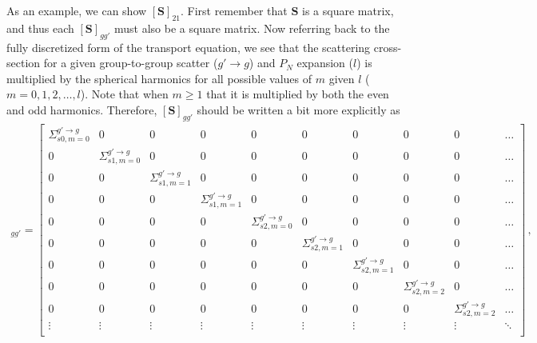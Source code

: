 \documentclass[10pt]{article}
\begin{document}
As an example, we can show $[\textbf{S}]_{21}$. First remember that $\textbf{S}$ is a square matrix, and thus each $[\textbf{S}]_{gg'}$ must also be a square matrix. Now referring back to the fully discretized form of the transport equation, we see that the scattering cross-section for a given group-to-group scatter ($g' \rightarrow g$) and $P_N$ expansion ($l$) is multiplied by the spherical harmonics for all possible values of $m$ given $l$ ($m=0,1,2,\dots,l$). Note that when $m \geq 1$ that it is multiplied by both the even and odd harmonics. Therefore, $[\textbf{S}]_{gg'}$ should be written a bit more explicitly as
%
\begin{align*}
[\textbf{S}]_{gg'} = 
\begin{bmatrix}
	\Sigma_{s0,m=0}^{g' \rightarrow g} & 0 & 0 & 0 & 0 & 0 & 0 & 0 & 0 & \dots \\
	0 & \Sigma_{s1,m=0}^{g' \rightarrow g} & 0 & 0 & 0 & 0 & 0 & 0 & 0 & \dots \\
	0 & 0 & \Sigma_{s1,m=1}^{g' \rightarrow g} & 0 & 0 & 0 & 0 & 0 & 0 & \dots \\
	0 & 0 & 0 & \Sigma_{s1,m=1}^{g' \rightarrow g} & 0 & 0 & 0 & 0 & 0 & \dots \\
	0 & 0 & 0 & 0 & \Sigma_{s2,m=0}^{g' \rightarrow g} & 0 & 0 & 0 & 0 & \dots \\
	0 & 0 & 0 & 0 & 0 & \Sigma_{s2,m=1}^{g' \rightarrow g} & 0 & 0 & 0 & \dots \\
	0 & 0 & 0 & 0 & 0 & 0 & \Sigma_{s2,m=1}^{g' \rightarrow g} & 0 & 0 & \dots \\
	0 & 0 & 0 & 0 & 0 & 0 & 0 & \Sigma_{s2,m=2}^{g' \rightarrow g} & 0 & \dots \\
	0 & 0 & 0 & 0 & 0 & 0 & 0 & 0 & \Sigma_{s2,m=2}^{g' \rightarrow g} & \dots \\
	\vdots & \vdots & \vdots & \vdots & \vdots & \vdots & \vdots & \vdots & \vdots &  \ddots \\
\end{bmatrix}\,,
\end{align*}
\end{document}
